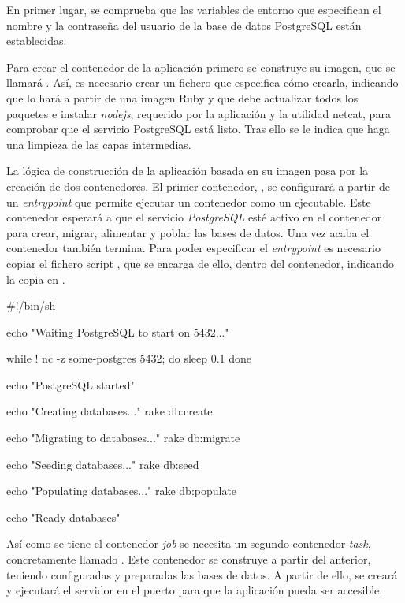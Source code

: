 En primer lugar, se comprueba que las variables de entorno que especifican el nombre y la contraseña del usuario de la base de datos PostgreSQL están establecidas.

Para crear el contenedor de la aplicación primero se construye su imagen, que se llamará . Así, es necesario crear un fichero  que especifica cómo crearla, indicando que lo hará a partir de una imagen Ruby y que debe actualizar todos los paquetes e instalar \textit{nodejs}, requerido por la aplicación y la utilidad netcat, para comprobar que el servicio PostgreSQL está listo. Tras ello se le indica que haga una limpieza de las capas intermedias. 

La lógica de construcción de la aplicación basada en su imagen pasa por la creación de dos contenedores. El primer contenedor, , se configurará a partir de un \textit{entrypoint} que permite ejecutar un contenedor como un ejecutable. Este contenedor esperará a que el servicio \textit{PostgreSQL} esté activo en el contenedor  para crear, migrar, alimentar y poblar las bases de datos. Una vez acaba el contenedor también termina. Para poder especificar el \textit{entrypoint} es necesario copiar el fichero script , que se encarga de ello, dentro del contenedor, indicando la copia en . 

\begin{codelisting}
\label{code:dockerfile}
\begin{code}
#!/bin/sh

echo "Waiting PostgreSQL to start on 5432..."

while ! nc -z some-postgres 5432; do
  sleep 0.1
done

echo "PostgreSQL started"

echo "Creating databases..."
rake db:create

echo "Migrating to databases..."
rake db:migrate

echo "Seeding databases..."
rake db:seed

echo "Populating databases..."
rake db:populate

echo "Ready databases"

\end{code}
\end{codelisting}

Así como se tiene el contenedor \textit{job} se necesita un segundo contenedor \textit{task}, concretamente llamado . Este contenedor se construye a partir del anterior, teniendo configuradas y preparadas las bases de datos. A partir de ello, se creará y ejecutará el servidor  en el puerto  para que la aplicación pueda ser accesible.

